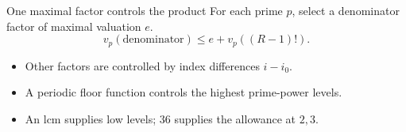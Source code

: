 \documentclass{beamer}
\begin{document}
\begin{frame}{One maximal factor controls the product}
For each prime $p$, select a denominator factor of maximal valuation $e$.
\[
v_p(\text{denominator})\leq e+v_p((R-1)!).
\]
\begin{itemize}
\item Other factors are controlled by index differences $i-i_0$.
\item A periodic floor function controls the highest prime-power levels.
\item An lcm supplies low levels; $36$ supplies the allowance at $2,3$.
\end{itemize}
\end{frame}
\end{document}

